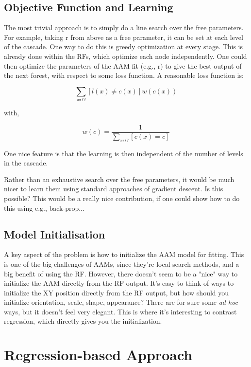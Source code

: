 \documentclass[10pt,twocolumn,letterpaper]{article}
\begin{document}
\subsection{Objective Function and Learning}

The most trivial approach is to simply do a line search over the free parameters. For example, taking r from above as a free parameter, it can be set at each level of the cascade. One way to do this is greedy optimization at every stage.  This is already done within the RFs, which optimize each node independently.  One could then optimize the parameters of the AAM fit (e.g., r) to give the best output of the next forest, with respect to some loss function.  A reasonable loss function is:

\[ \sum_{x \epsilon \Omega} [l(x) \neq c(x)] w(c(x)) \]

with,

\[ w(c) = \frac{1}{\sum_{x \epsilon \Omega} [c(x) = c]} \]

One nice feature is that the learning is then independent of the number of levels in the cascade.

Rather than an exhaustive search over the free parameters, it would be much nicer to learn them using standard approaches of gradient descent.  Is this possible?  This would be a really nice contribution, if one could show how to do this using e.g., back-prop...

\subsection{Model Initialisation}

A key aspect of the problem is how to initialize the AAM model for fitting.  This is one of the big challenges of AAMs, since they're local search methods, and a big benefit of using the RF.  However, there doesn't seem to be a "nice" way to initialize the AAM directly from the RF output.  It's easy to think of ways to initialize the XY position directly from the RF output, but how should you initialize orientation, scale, shape, appearance?  There are for sure some \emph{ad hoc} ways, but it doesn't feel very elegant.  This is where it's interesting to contrast regression, which directly gives you the initialization.

\section{Regression-based Approach}
\end{document}
